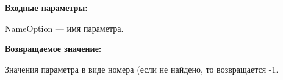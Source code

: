 \textbf{Входные параметры:}

NameOption --- имя параметра.

\textbf{Возвращаемое значение:}

Значения параметра в виде номера (если не найдено, то возвращается -1.